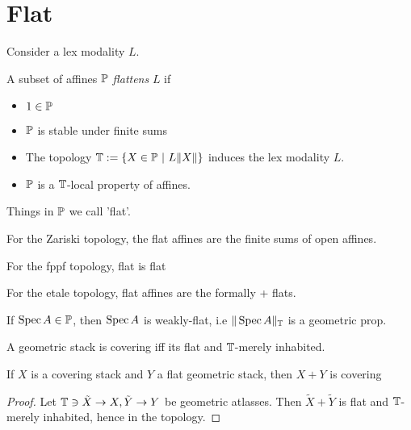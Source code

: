 \section{Flat}
Consider a lex modality $L$.
\begin{definition}
	A subset of affines $\mathbb{P}$ \emph{flattens} $L$ if
	\begin{itemize}
		\item $1 \in \mathbb{P}$
		\item $\mathbb{P}$ is stable under finite sums
		\item The topology $\bT := \{ X \in \bP \ | \ L \| X \| \}$ induces the lex modality $L$.
		\item $\mathbb{P}$ is a $\mathbb{T}$-local property of affines.

	\end{itemize}
	
\end{definition}

Things in $\mathbb{P}$ we call 'flat'.
\begin{example}
	For the Zariski topology, the flat affines are the finite sums of open affines.
\end{example}
\begin{example}
	For the fppf topology, flat is flat
\end{example}
\begin{example}
	For the etale topology, flat affines are the formally \etale + flats.
\end{example}
\begin{lemma}
	If $\operatorname{Spec} A \in \mathbb{P}$, then $\operatorname{Spec} A$ is weakly-flat, i.e $\| \operatorname{Spec} A\|_{\mathbb{T}}$ is a geometric prop.
\end{lemma}
\begin{lemma}{\label{lemma:detectCovering}}
	A geometric stack is covering iff its flat and $\mathbb{T}$-merely inhabited.
\end{lemma}

\begin{lemma}
	If $X$ is a covering stack and $Y$ a flat geometric stack, then $X + Y$ is covering
\end{lemma}
\begin{proof}
	Let $\mathbb{T} \ni \tilde X \to X, \tilde Y \to Y$ be geometric atlasses. Then $\tilde X+ \tilde Y$ is flat and $\mathbb{T}$-merely inhabited, hence in the topology.
\end{proof}



